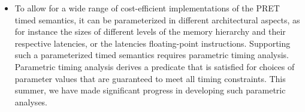 \begin{itemize}
               \item To allow for a wide range of cost-efficient
                 implementations of the PRET timed semantics, it can
                 be parameterized in different architectural
                 aspects, as for instance the sizes of different
                 levels of the memory hierarchy and their respective
                 latencies, or the latencies floating-point
                 instructions. Supporting such a parameterized timed
                 semantics requires parametric timing
                 analysis. Parametric timing analysis derives a
                 predicate that is satisfied for choices of
                 parameter values that are guaranteed to meet all
                 timing constraints. This summer, we have made
                 significant progress in developing such parametric
                 analyses.

               \end{itemize}


